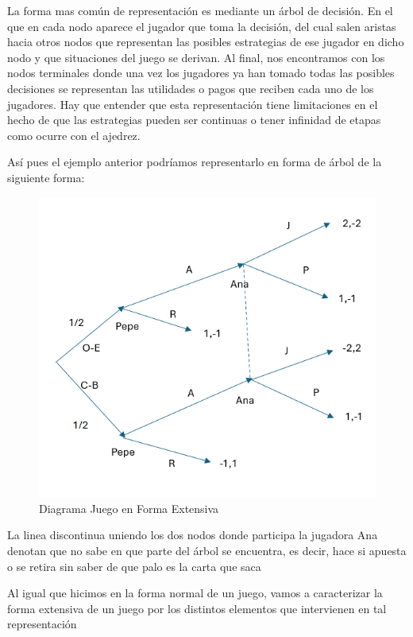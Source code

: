 \documentclass[12pt,a4paper,]{book}
\numberwithin{dummy}{section}
\theoremstyle{ocrenumbox}
\theoremstyle{blacknumex}
\theoremstyle{blacknumbox}
\theoremstyle{ocrenum}
\theoremstyle{ocrenum}
\begin{document}
La forma mas común de representación es mediante un árbol de decisión.
En el que en cada nodo aparece el jugador que toma la decisión, del cual
salen aristas hacia otros nodos que representan las posibles estrategias
de ese jugador en dicho nodo y que situaciones del juego se derivan. Al
final, nos encontramos con los nodos terminales donde una vez los
jugadores ya han tomado todas las posibles decisiones se representan las
utilidades o pagos que reciben cada uno de los jugadores. Hay que
entender que esta representación tiene limitaciones en el hecho de que
las estrategias pueden ser continuas o tener infinidad de etapas como
ocurre con el ajedrez.

Así pues el ejemplo anterior podríamos representarlo en forma de árbol
de la siguiente forma:

\begin{figure}[H]

{\centering \includegraphics[width=0.8\linewidth]{forma_extensiva} 

}

\caption{\label{forma_extensiva}Diagrama Juego en Forma Extensiva}\label{fig:forma_extensiva}
\end{figure}

La linea discontinua uniendo los dos nodos donde participa la jugadora
Ana denotan que no sabe en que parte del árbol se encuentra, es decir,
hace si apuesta o se retira sin saber de que palo es la carta que saca

Al igual que hicimos en la forma normal de un juego, vamos a
caracterizar la forma extensiva de un juego por los distintos elementos
que intervienen en tal representación
\end{document}
